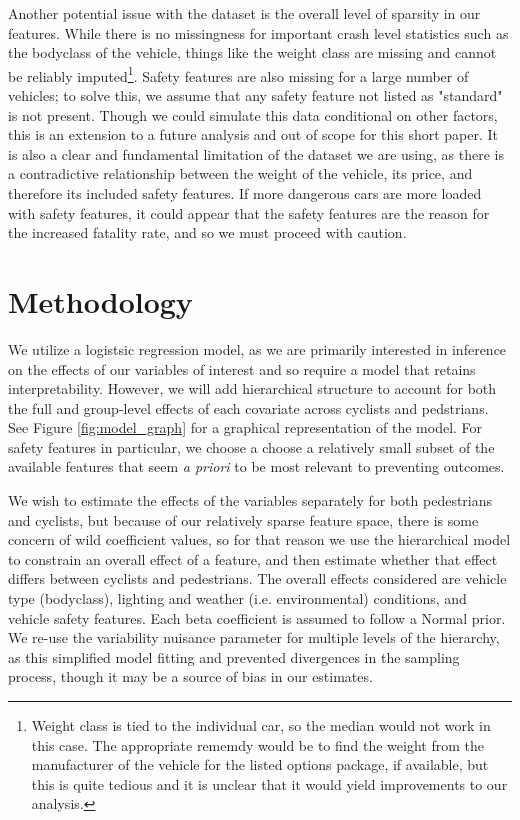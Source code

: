 \documentclass[12pt]{article}
\begin{document}
Another potential issue with the dataset is the overall level of sparsity in our features. While there is no
missingness for important crash level statistics such as the bodyclass of the vehicle, things like the weight class
are missing and cannot be reliably imputed\footnote{
    Weight class is tied to the individual car, so the median would not work in this case. The appropriate rememdy would be to  
    find the weight from the manufacturer of the vehicle for the listed options package, if available, but this is quite 
    tedious and it is unclear that it would yield improvements to our analysis.}. 
Safety features are also missing for a large number of vehicles; to solve
this, we assume that any safety feature not listed as "standard" is not present. Though we could simulate this data
conditional on other factors, this is an extension to a future analysis and out of scope for this short paper. It is 
also a clear and fundamental limitation of the dataset we are using, as there is a contradictive relationship between
the weight of the vehicle, its price, and therefore its included safety features. If more dangerous cars are more loaded
with safety features, it could appear that the safety features are the reason for the increased fatality rate, and so
we must proceed with caution.

\section{Methodology}

We utilize a logistsic regression model, as we are primarily interested in inference on the
effects of our variables of interest and so require a model that retains interpretability. However, we will
add hierarchical structure to account for both the full and group-level effects of each covariate across
cyclists and pedstrians. See Figure \ref{fig:model_graph} for a graphical representation of the model. For safety
features in particular, we choose a choose a relatively small subset of the available features that seem 
\textit{a priori} to be most relevant to preventing outcomes. 

We wish to estimate the effects of the variables separately for both pedestrians and cyclists, but because of our
relatively sparse feature space, there is some concern of wild coefficient values, so for that reason we use the
hierarchical model to constrain an overall effect of a feature, and then estimate whether that effect differs
between cyclists and pedestrians. The overall effects considered are vehicle type (bodyclass), lighting and weather
(i.e. environmental) conditions, and vehicle safety features. Each beta coefficient is assumed to follow a Normal prior. 
We re-use the variability nuisance parameter for multiple levels of the hierarchy, as this simplified model fitting and 
prevented divergences in the sampling process, though it may be a source of bias in our estimates.
\end{document}
